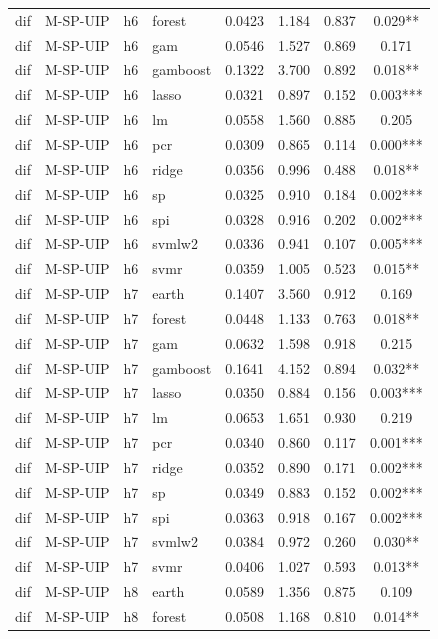 \begin{ThreePartTable}
\begin{longtable}[t]{llclcccc}
dif & M-SP-UIP & h6 & forest & 0.0423 & 1.184 & 0.837 & 0.029**\\
dif & M-SP-UIP & h6 & gam & 0.0546 & 1.527 & 0.869 & 0.171\\
dif & M-SP-UIP & h6 & gamboost & 0.1322 & 3.700 & 0.892 & 0.018**\\
dif & M-SP-UIP & h6 & lasso & 0.0321 & 0.897 & 0.152 & 0.003***\\
dif & M-SP-UIP & h6 & lm & 0.0558 & 1.560 & 0.885 & 0.205\\
dif & M-SP-UIP & h6 & pcr & 0.0309 & 0.865 & 0.114 & 0.000***\\
dif & M-SP-UIP & h6 & ridge & 0.0356 & 0.996 & 0.488 & 0.018**\\
dif & M-SP-UIP & h6 & sp & 0.0325 & 0.910 & 0.184 & 0.002***\\
dif & M-SP-UIP & h6 & spi & 0.0328 & 0.916 & 0.202 & 0.002***\\
dif & M-SP-UIP & h6 & svmlw2 & 0.0336 & 0.941 & 0.107 & 0.005***\\
dif & M-SP-UIP & h6 & svmr & 0.0359 & 1.005 & 0.523 & 0.015**\\
\addlinespace
dif & M-SP-UIP & h7 & earth & 0.1407 & 3.560 & 0.912 & 0.169\\
dif & M-SP-UIP & h7 & forest & 0.0448 & 1.133 & 0.763 & 0.018**\\
dif & M-SP-UIP & h7 & gam & 0.0632 & 1.598 & 0.918 & 0.215\\
dif & M-SP-UIP & h7 & gamboost & 0.1641 & 4.152 & 0.894 & 0.032**\\
dif & M-SP-UIP & h7 & lasso & 0.0350 & 0.884 & 0.156 & 0.003***\\
dif & M-SP-UIP & h7 & lm & 0.0653 & 1.651 & 0.930 & 0.219\\
dif & M-SP-UIP & h7 & pcr & 0.0340 & 0.860 & 0.117 & 0.001***\\
dif & M-SP-UIP & h7 & ridge & 0.0352 & 0.890 & 0.171 & 0.002***\\
dif & M-SP-UIP & h7 & sp & 0.0349 & 0.883 & 0.152 & 0.002***\\
dif & M-SP-UIP & h7 & spi & 0.0363 & 0.918 & 0.167 & 0.002***\\
dif & M-SP-UIP & h7 & svmlw2 & 0.0384 & 0.972 & 0.260 & 0.030**\\
dif & M-SP-UIP & h7 & svmr & 0.0406 & 1.027 & 0.593 & 0.013**\\
\addlinespace
dif & M-SP-UIP & h8 & earth & 0.0589 & 1.356 & 0.875 & 0.109\\
dif & M-SP-UIP & h8 & forest & 0.0508 & 1.168 & 0.810 & 0.014**\\

\end{longtable}
\end{ThreePartTable}
